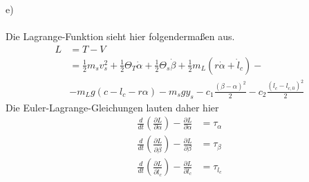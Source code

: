 \newpage
\noindent
e) \\ \\
Die Lagrange-Funktion sieht hier folgendermaßen aus.
\begin{align*}
	L &= T - V \\
	  &= \frac{1}{2}m_sv_s^2 + \frac{1}{2}\Theta_T\dot{\alpha} + \frac{1}{2}\Theta_s\dot{\beta} + \frac{1}{2}m_L(r\dot{\alpha} + \dot{l}_c) - \\
	  &- m_Lg(c - l_c - r\alpha) - m_sgy_s - c_1\frac{(\beta - \alpha)^2}{2} - c_2 \frac{(l_c - l_{c,0})^2}{2}
\end{align*}
Die Euler-Lagrange-Gleichungen lauten daher hier
\begin{align*}
	\frac{d}{dt}\left(\frac{\partial L}{\partial \dot{\alpha}}\right) - \frac{\partial L}{\partial \alpha} &= \tau_\alpha \\
	\frac{d}{dt}\left(\frac{\partial L}{\partial \dot{\beta}}\right) - \frac{\partial L}{\partial \beta} &= \tau_\beta \\
	\frac{d}{dt}\left(\frac{\partial L}{\partial \dot{l}_c}\right) - \frac{\partial L}{\partial l_c} &= \tau_{l_c}
\end{align*}